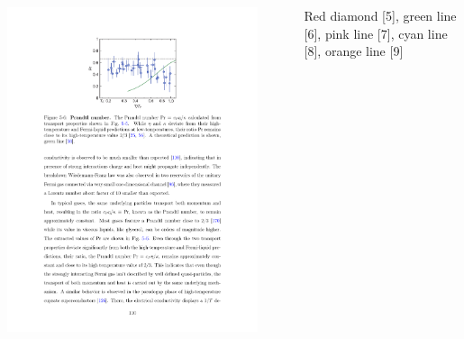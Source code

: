 \documentclass[26pt, paperwidth=36in,paperheight=48in]{tikzposter} %
\newcommand{\mysmallerfont}{\fontsize{20}{30}\selectfont}
\begin{document}
\begin{columns}
{\begin{minipage}{0.16\textwidth}
	\end{minipage}
	\hspace{1cm}
	\begin{minipage}{0.22\textwidth}
		\includegraphics[width=0.9\textwidth,
		trim=7cm 19cm 7cm 2cm, clip]{figures/prandtl.pdf}
	\end{minipage}

	\vspace{-0.9cm}
	\begin{center}
		\begin{minipage}{0.4\textwidth}
			\mysmallerfont
			\centering 
			Red diamond [5], green line [6], pink line [7], cyan line [8], orange line [9] 
		\end{minipage}
	\end{center}
	
	}

	
	
	
\end{columns}
\end{document}
